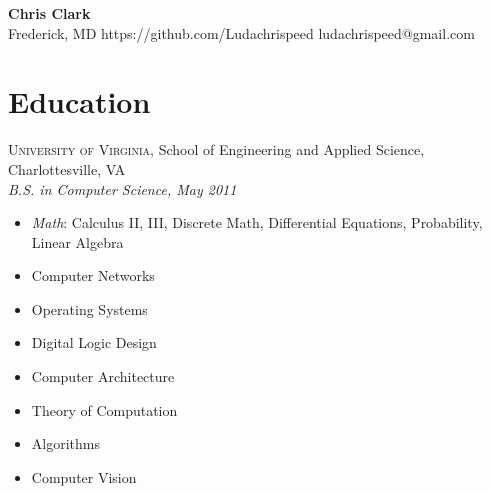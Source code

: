 \documentclass[a4paper,11pt]{article}
\begin{document}
\begin{center}
  {\sffamily \huge \textbf{Chris Clark}} \\
  Frederick, MD \enspace\textopenbullet\enspace
  https://github.com/Ludachrispeed \enspace\textopenbullet\enspace
  ludachrispeed@gmail.com
\end{center}


\vspace{-9pt}
\section*{Education}

  \textsc{University of Virginia}, School of Engineering and Applied Science,
  Charlottesville, VA \\
  \textit{B.S. in Computer Science, May 2011}

%

  \begin{multicols}{3}
    \raggedright

    \begin{itemize}
    \item \textit{Math}: Calculus II, III, Discrete Math, Differential Equations, Probability,
      Linear Algebra
    \item Computer Networks
    \item Operating Systems
    \item Digital Logic Design
    \item Computer Architecture
    \item Theory of Computation
    \item Algorithms
    \item Computer Vision
    \end{itemize}
  \end{multicols}
\end{document}
